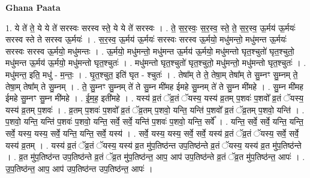 \documentclass[17pt]{extarticle}
\begin{document}
\textbf{Ghana Paata } \newline

1. ये ते॑ ते॒ ये ये ते॑ सरस्वः सरस्व स्ते॒ ये ये ते॑ सरस्वः । . ते॒ स॒र॒स्वः॒ स॒र॒स्व॒ स्ते॒ ते॒ स॒र॒स्व॒ ऊ॒र्मय॑ ऊ॒र्मयः॑ सरस्व स्ते ते सरस्व ऊ॒र्मयः॑ । . स॒र॒स्व॒ ऊ॒र्मय॑ ऊ॒र्मयः॑ सरस्वः सरस्व ऊ॒र्मयो॒ मधु॑मन्तो॒ मधु॑मन्त ऊ॒र्मयः॑ सरस्वः सरस्व ऊ॒र्मयो॒ मधु॑मन्तः । . ऊ॒र्मयो॒ मधु॑मन्तो॒ मधु॑मन्त ऊ॒र्मय॑ ऊ॒र्मयो॒ मधु॑मन्तो घृत॒श्चुतो॑ घृत॒श्चुतो॒ मधु॑मन्त ऊ॒र्मय॑ ऊ॒र्मयो॒ मधु॑मन्तो घृत॒श्चुतः॑ । . मधु॑मन्तो घृत॒श्चुतो॑ घृत॒श्चुतो॒ मधु॑मन्तो॒ मधु॑मन्तो घृत॒श्चुतः॑ । . मधु॑मन्त॒ इति॒ मधु॑ - म॒न्तः॒ । . घृ॒त॒श्चुत॒ इति॑ घृत - श्चुतः॑ । . तेषा᳚म् ते ते॒ तेषा॒म् तेषा᳚म् ते सु॒म्नꣳ सु॒म्नम् ते॒ तेषा॒म् तेषा᳚म् ते सु॒म्नम् । . ते॒ सु॒म्नꣳ सु॒म्नम् ते॑ ते सु॒म्न मी॑मह ईमहे सु॒म्नम् ते॑ ते सु॒म्न मी॑महे । . सु॒म्न मी॑मह ईमहे सु॒म्नꣳ सु॒म्न मी॑महे । . ई॒म॒ह॒ इती॑महे । . यस्य॑ व्र॒तं ॅव्र॒तं ॅयस्य॒ यस्य॑ व्र॒तम् प॒शवः॑ प॒शवो᳚ व्र॒तं ॅयस्य॒ यस्य॑ व्र॒तम् प॒शवः॑ । . व्र॒तम् प॒शवः॑ प॒शवो᳚ व्र॒तं ॅव्र॒तम् प॒शवो॒ यन्ति॒ यन्ति॑ प॒शवो᳚ व्र॒तं ॅव्र॒तम् प॒शवो॒ यन्ति॑ । . प॒शवो॒ यन्ति॒ यन्ति॑ प॒शवः॑ प॒शवो॒ यन्ति॒ सर्वे॒ सर्वे॒ यन्ति॑ प॒शवः॑ प॒शवो॒ यन्ति॒ सर्वे᳚ । . यन्ति॒ सर्वे॒ सर्वे॒ यन्ति॒ यन्ति॒ सर्वे॒ यस्य॒ यस्य॒ सर्वे॒ यन्ति॒ यन्ति॒ सर्वे॒ यस्य॑ । . सर्वे॒ यस्य॒ यस्य॒ सर्वे॒ सर्वे॒ यस्य॑ व्र॒तं ॅव्र॒तं ॅयस्य॒ सर्वे॒ सर्वे॒ यस्य॑ व्र॒तम् । . यस्य॑ व्र॒तं ॅव्र॒तं ॅयस्य॒ यस्य॑ व्र॒त मु॑प॒तिष्ठ॑न्त उप॒तिष्ठ॑न्ते व्र॒तं ॅयस्य॒ यस्य॑ व्र॒त मु॑प॒तिष्ठ॑न्ते । . व्र॒त मु॑प॒तिष्ठ॑न्त उप॒तिष्ठ॑न्ते व्र॒तं ॅव्र॒त मु॑प॒तिष्ठ॑न्त॒ आप॒ आप॑ उप॒तिष्ठ॑न्ते व्र॒तं ॅव्र॒त मु॑प॒तिष्ठ॑न्त॒ आपः॑ । . उ॒प॒तिष्ठ॑न्त॒ आप॒ आप॑ उप॒तिष्ठ॑न्त उप॒तिष्ठ॑न्त॒ आपः॑ । \newline
\end{document}
